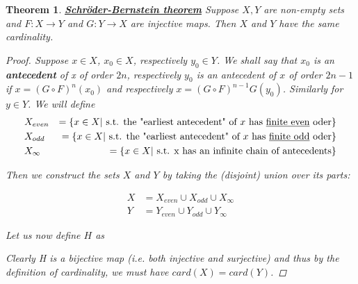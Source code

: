 \documentclass[12pt,letterpaper]{article}
\newtheorem{thrm}{Theorem}
\newcommand{\biu}[1]{\underline{\textbf{\textit{#1}}}}
\begin{document}
\begin{thrm}
\biu{Schr\"{o}der-Bernstein theorem}\newline
Suppose $X,Y$ are non-empty sets and $F: X\to Y$ and $G: Y\to X$ are injective maps. Then $X$ and $Y$ have the same cardinality.
\begin{proof}
Suppose $x\in X$, $x_0 \in X$, respectively $y_0\in Y$. \newline 
We shall say that $x_0$ is an \textbf{antecedent} of x of order $2n$, respectively $y_0$ is an antecedent of $x$ of order $2n-1$ if $x=(G\circ F)^n(x_0)$ and respectively $x=(G\circ F)^{n-1}G(y_0)$. Similarly for $y\in Y$.\newline
We will define 
\begin{eqnarray*}
 &X_{even} &= \left\{ x\in X | \text{ s.t. the "earliest antecedent" of } x \text{ has \underline{finite even} oder}\right\}\\
 &X_{odd} &= \left\{x\in X | \text{ s.t. the "earliest antecedent" of } x \text{ has \underline{finite odd} oder}\right\}\\
 &X_\infty &= \left\{x\in X | \text{ s.t. x has an infinite chain of antecedents}\right\}
\end{eqnarray*}

Then we construct the sets $X$ and $Y$ by taking the (disjoint) union over its parts:

\begin{align*}
X &= X_{even} \cup X_{odd} \cup X_\infty \\
Y &= Y_{even} \cup Y_{odd} \cup Y_\infty
\end{align*}

Let us now define $H$ as 

\begin{center}
\end{center}

Clearly H is a bijective map (i.e. both injective and surjective) and thus by the definition of cardinality, we must have $card(X)=card(Y)$.

\end{proof}
\end{thrm}
\end{document}
